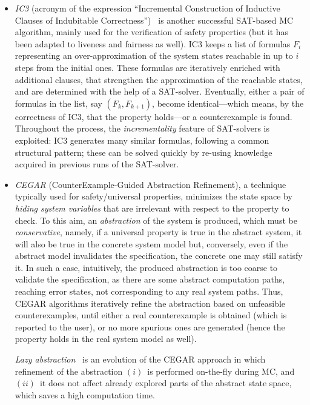 \begin{itemize}
\item
\emph{IC3} (acronym of the expression ``Incremental Construction of Inductive Clauses of Indubitable Correctness'')~\cite{Bradley2011,Bradley2012} is another successful SAT-based MC algorithm,
mainly used for the verification of safety properties (but it has been adapted to liveness and fairness as well). 
IC3 keeps a list of formulas $F_i$ representing an over-approximation of the system states reachable in up to $i$ steps from the initial ones. These formulas are iteratively enriched with additional clauses, that strengthen the approximation of the reachable states, and are determined with the help of a SAT-solver. Eventually, either a pair of formulas in the list, say $(F_k,F_{k+1})$, become identical---which means, by the correctness of IC3, that the property holds---or a counterexample is found. Throughout the process, the \emph{incrementality} feature of SAT-solvers is exploited: IC3 generates many similar formulas, following a common structural pattern; these can be solved quickly by re-using knowledge acquired in previous runs of the SAT-solver.

\item
\emph{CEGAR} (CounterExample-Guided Abstraction Refinement), 
a technique typically used for safety/universal properties,
minimizes the state space by \emph{hiding system variables}
that are irrelevant with respect to the property to check.
To this aim, an \emph{abstraction} of the system is produced, which must be \emph{conservative}, namely,
if a universal property is true in the abstract system, 
it will also be true in the concrete system model but, conversely,
even if the abstract model invalidates the
specification, the concrete one may still satisfy it.
In such a case, intuitively, the produced abstraction is too
coarse to validate the specification, as there are some abstract computation paths, reaching error states, not corresponding to
any real system paths.
Thus, CEGAR algorithms iteratively refine the abstraction based on unfeasible counterexamples, until either a real
counterexample is obtained (which is reported to the user), or no more spurious
ones are generated (hence the property holds in the real system model as well).

\emph{Lazy abstraction}~\cite{Henzinger02,McMillan2006} is an evolution of the CEGAR approach in which 
refinement of the abstraction $(i)$~is performed on-the-fly during MC, 
and $(ii)$~it does not affect already explored parts
of the abstract state space, which saves a high computation time.
\end{itemize}

